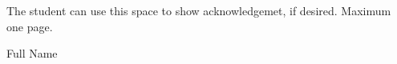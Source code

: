 The student can use this space to show acknowledgemet, if desired. Maximum one page.

\vspace{5cm}
\begin{flushright}
    Full Name
\end{flushright}